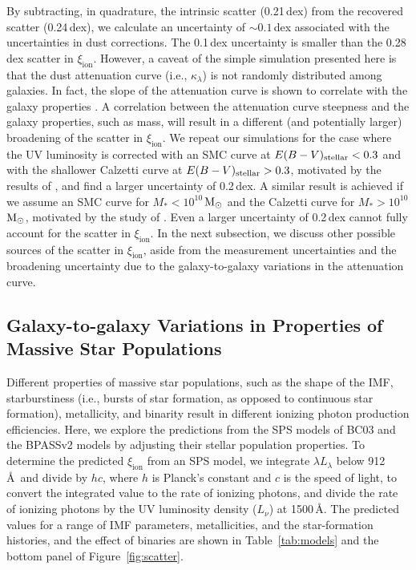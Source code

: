 \documentclass[iop]{emulateapj}
\newcommand{\xiion}{\ensuremath{\xi_{\mathrm{ion}}}}
\def\msun{${\rm M_\odot}$}
\begin{document}
By subtracting, in quadrature, the intrinsic scatter (0.21\,dex) from the recovered scatter (0.24\,dex), we calculate an uncertainty of $\sim 0.1$\,dex associated with the uncertainties in dust corrections. The 0.1\,dex uncertainty is smaller than the 0.28\,dex scatter in {\xiion}. However, a caveat of the simple simulation presented here is that the dust attenuation curve (i.e., $\kappa_{\lambda}$) is not randomly distributed among galaxies. In fact, the slope of the attenuation curve is shown to correlate with the galaxy properties \citep[e.g.,][]{noll09,kriek13,reddy16a,salmon16}. A correlation between the attenuation curve steepness and the galaxy properties, such as mass, will result in a different (and potentially larger) broadening of the scatter in {\xiion}. We repeat our simulations for the case where the UV luminosity is corrected with an SMC curve at $E(B-V)_{\rm stellar} < 0.3$ and with the shallower Calzetti curve at $E(B-V)_{\rm stellar} > 0.3$, motivated by the results of \citet{salmon16}, and find a larger uncertainty of 0.2\,dex. A similar result is achieved if we assume an SMC curve for $M_* < 10^{10}$\,{\msun} and the Calzetti curve for $M_* > 10^{10}$\,{\msun}, motivated by the study of \citet{reddy16a}.
Even a larger uncertainty of 0.2\,dex cannot fully account for the scatter in {\xiion}.
In the next subsection, we discuss other possible sources of the scatter in {\xiion}, aside from the measurement uncertainties and the broadening uncertainty due to the galaxy-to-galaxy variations in the attenuation curve.


\subsection{Galaxy-to-galaxy Variations in Properties of Massive Star Populations}
\label{sec:sps}

Different properties of massive star populations, such as the shape of the IMF, starburstiness (i.e., bursts of star formation, as opposed to continuous star formation), metallicity, and binarity result in different ionizing photon production efficiencies. 
Here, we explore the predictions from the SPS models of BC03 and the BPASSv2 models \citep{eldridge16,stanway16} by adjusting their stellar population properties. 
To determine the predicted {\xiion} from an SPS model, we integrate $\lambda L_{\lambda}$ below 912\,\AA~and divide by $hc$, where $h$ is Planck's constant and $c$ is the speed of light, to convert the integrated value to the rate of ionizing photons, and divide the rate of ionizing photons by the UV luminosity density ($L_\nu$) at 1500\,\AA. The predicted values for a range of IMF parameters, metallicities, and the star-formation histories, and the effect of binaries are shown in Table~\ref{tab:models} and the bottom panel of Figure~\ref{fig:scatter}.
\end{document}
